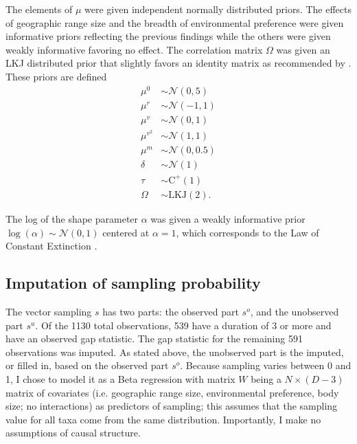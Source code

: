 \documentclass[11pt]{article}
\begin{document}
The elements of \(\mu\) were given independent normally distributed priors. The effects of geographic range size  and the breadth of environmental preference were given informative priors reflecting the previous findings while the others were given weakly informative favoring no effect. The correlation matrix \(\Omega\) was given an LKJ distributed prior \citep{Lewandowski2009} that slightly favors an identity matrix as recommended by \citet{StanManual}. These priors are defined
\begin{equation}
  \begin{aligned}
    \mu^{0} &\sim \mathcal{N}(0, 5) \\
    \mu^{r} &\sim \mathcal{N}(-1, 1) \\
    \mu^{v} &\sim \mathcal{N}(0, 1) \\
    \mu^{v^{2}} &\sim \mathcal{N}(1, 1) \\
    \mu^{m} &\sim \mathcal{N}(0, 0.5) \\
    \delta &\sim \mathcal{N}(1) \\
    \tau &\sim \mathrm{C^{+}}(1) \\
    \Omega &\sim \text{LKJ}(2).
  \end{aligned}
  \label{eq:sigma_prior}
\end{equation}

The log of the shape parameter \(\alpha\) was given a weakly informative prior \(\log(\alpha) \sim \mathcal{N}(0, 1)\) centered at \(\alpha = 1\), which corresponds to the Law of Constant Extinction \citep{VanValen1973}.

\subsection*{Imputation of sampling probability}
The vector sampling \(s\) has two parts: the observed part \(s^{o}\), and the unobserved part \(s^{u}\). Of the 1130 total observations, 539 have a duration of 3 or more and have an observed gap statistic. The gap statistic for the remaining 591 observations was imputed. As stated above, the unobserved part is the imputed, or filled in, based on the observed part \(s^{o}\). Because sampling varies between 0 and 1, I chose to model it as a Beta regression with matrix \(W\) being a \(N \times (D - 3)\) matrix of covariates (i.e. geographic range size, environmental preference, body size; no interactions) as predictors of sampling; this assumes that the sampling value for all taxa come from the same distribution. Importantly, I make no assumptions of causal structure. 
\end{document}
